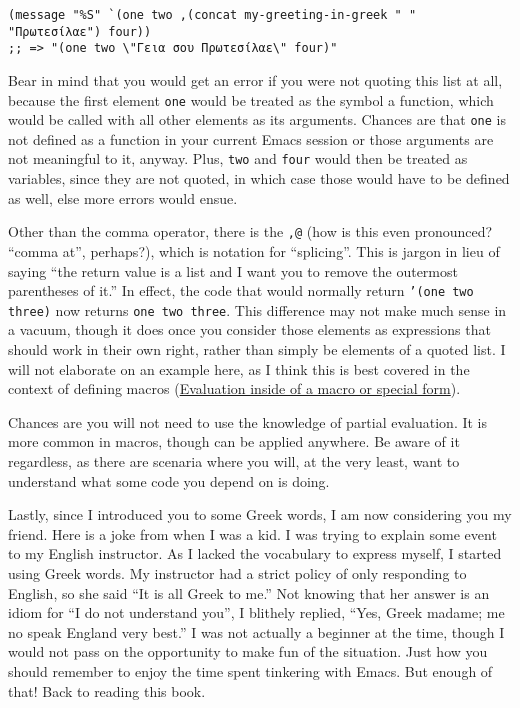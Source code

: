 \documentclass[11pt]{ctexart}
\begin{document}
\begin{verbatim}
(message "%S" `(one two ,(concat my-greeting-in-greek " " "Πρωτεσίλαε") four))
;; => "(one two \"Γεια σου Πρωτεσίλαε\" four)"
\end{verbatim}

Bear in mind that you would get an error if you were not quoting this list at all, because the first element \texttt{one} would be treated as the symbol a function, which would be called with all other elements as its arguments. Chances are that \texttt{one} is not defined as a function in your current Emacs session or those arguments are not meaningful to it, anyway. Plus, \texttt{two} and \texttt{four} would then be treated as variables, since they are not quoted, in which case those would have to be defined as well, else more errors would ensue.

Other than the comma operator, there is the \texttt{,@} (how is this even pronounced? ``comma at'', perhaps?), which is notation for ``splicing''. This is jargon in lieu of saying ``the return value is a list and I want you to remove the outermost parentheses of it.'' In effect, the code that would normally return \texttt{'(one two three)} now returns \texttt{one two three}. This difference may not make much sense in a vacuum, though it does once you consider those elements as expressions that should work in their own right, rather than simply be elements of a quoted list. I will not elaborate on an example here, as I think this is best covered in the context of defining macros (\hyperref[sec:org61e1a1b]{Evaluation inside of a macro or special form}).

Chances are you will not need to use the knowledge of partial evaluation. It is more common in macros, though can be applied anywhere. Be aware of it regardless, as there are scenaria where you will, at the very least, want to understand what some code you depend on is doing.

Lastly, since I introduced you to some Greek words, I am now considering you my friend. Here is a joke from when I was a kid. I was trying to explain some event to my English instructor. As I lacked the vocabulary to express myself, I started using Greek words. My instructor had a strict policy of only responding to English, so she said ``It is all Greek to me.'' Not knowing that her answer is an idiom for ``I do not understand you'', I blithely replied, ``Yes, Greek madame; me no speak England very best.'' I was not actually a beginner at the time, though I would not pass on the opportunity to make fun of the situation. Just how you should remember to enjoy the time spent tinkering with Emacs. But enough of that! Back to reading this book.
\end{document}
